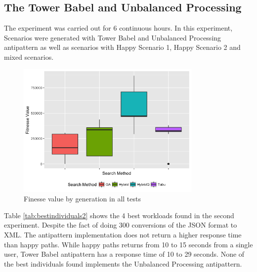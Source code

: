\documentclass{report}
\begin{document}
\subsection{The Tower Babel  and Unbalanced Processing}


The experiment was carried out for 6 continuous hours. In this experiment, Scenarios were generated with Tower Babel and Unbalanced Processing antipattern as well as scenarios with Happy Scenario 1, Happy Scenario 2 and mixed scenarios.

\begin{figure}[h]
\centering
\includegraphics[width=0.8\textwidth]{./images/experiment2-2.png}
\caption{Finesse value by generation in all tests}
\label{fig:boxplot2}
\end{figure}



Table \ref{tab:bestindividuals2} shows the 4 best workloads found in the second experiment. Despite the fact of doing 300 conversions of the JSON format to XML. The antipattern implementation does not return a higher response time than happy paths. While happy paths returns from 10 to 15 seconds from a single user, Tower Babel antipattern has a response time of 10 to 29 seconds. None of the best individuals found implements the Unbalanced Processing antipattern.
\end{document}
